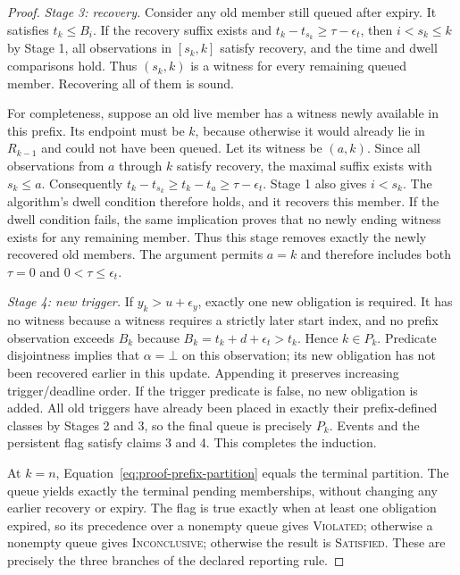 \begin{proof}
\emph{Stage 3: recovery.} Consider any old member still queued after expiry. It satisfies $t_k\leq B_i$. If the recovery suffix exists and $t_k-t_{s_k}\geq\tau-\epsilon_t$, then $i<s_k\leq k$ by Stage 1, all observations in $[s_k,k]$ satisfy recovery, and the time and dwell comparisons hold. Thus $(s_k,k)$ is a witness for every remaining queued member. Recovering all of them is sound.

For completeness, suppose an old live member has a witness newly available in this prefix. Its endpoint must be $k$, because otherwise it would already lie in $R_{k-1}$ and could not have been queued. Let its witness be $(a,k)$. Since all observations from $a$ through $k$ satisfy recovery, the maximal suffix exists with $s_k\leq a$. Consequently
$t_k-t_{s_k}\geq t_k-t_a\geq\tau-\epsilon_t$.
Stage 1 also gives $i<s_k$. The algorithm's dwell condition therefore holds, and it recovers this member. If the dwell condition fails, the same implication proves that no newly ending witness exists for any remaining member. Thus this stage removes exactly the newly recovered old members. The argument permits $a=k$ and therefore includes both $\tau=0$ and $0<\tau\leq\epsilon_t$.

\emph{Stage 4: new trigger.} If $y_k>u+\epsilon_y$, exactly one new obligation is required. It has no witness because a witness requires a strictly later start index, and no prefix observation exceeds $B_k$ because $B_k=t_k+d+\epsilon_t>t_k$. Hence $k\in P_k$. Predicate disjointness implies that $\alpha=\bot$ on this observation; its new obligation has not been recovered earlier in this update. Appending it preserves increasing trigger/deadline order. If the trigger predicate is false, no new obligation is added. All old triggers have already been placed in exactly their prefix-defined classes by Stages 2 and 3, so the final queue is precisely $P_k$. Events and the persistent flag satisfy claims 3 and 4. This completes the induction.

At $k=n$, Equation~\eqref{eq:proof-prefix-partition} equals the terminal partition. The queue yields exactly the terminal pending memberships, without changing any earlier recovery or expiry. The flag is true exactly when at least one obligation expired, so its precedence over a nonempty queue gives \textsc{Violated}; otherwise a nonempty queue gives \textsc{Inconclusive}; otherwise the result is \textsc{Satisfied}. These are precisely the three branches of the declared reporting rule.
\end{proof}

